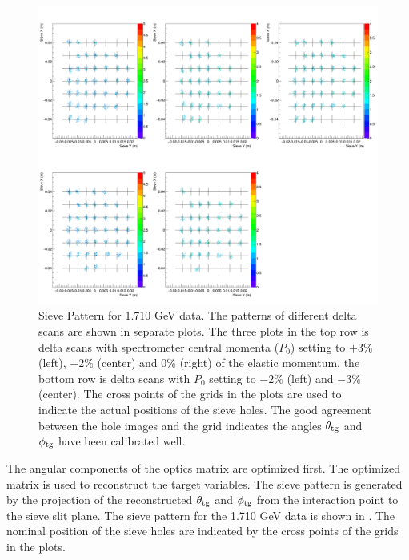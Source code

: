 \begin{figure}[b!]
  \centering
  \includegraphics[width=\textwidth]{figs/sieve-pattern.png}
  \caption[Sieve Pattern for 1.710 GeV data.]{Sieve Pattern for 1.710 GeV data. The patterns of different delta scans are shown in separate plots. The three plots in the top row is delta scans with spectrometer central momenta ($P_0$) setting to $+3\%$ (left), $+2\%$ (center) and $0\%$ (right) of the elastic momentum, the bottom row is delta scans with $P_0$ setting to $-2\%$ (left) and $-3\%$ (center). The cross points of the grids in the plots are used to indicate the actual positions of the sieve holes. The good agreement between the hole images and the grid indicates the angles $\theta_{\mathrm{tg}}$ and $\phi_{\mathrm{tg}}$ have been calibrated well. \label{C6S3SS2F3}}
\end{figure}

The angular components of the optics matrix are optimized first. The optimized matrix is used to reconstruct the target variables. The sieve pattern is generated by the projection of the reconstructed $\theta_{\mathrm{tg}}$ and $\phi_{\mathrm{tg}}$ from the interaction point to the sieve slit plane. The sieve pattern for the 1.710 GeV data is shown in . The nominal position of the sieve holes are indicated by the cross points of the grids in the plots.


